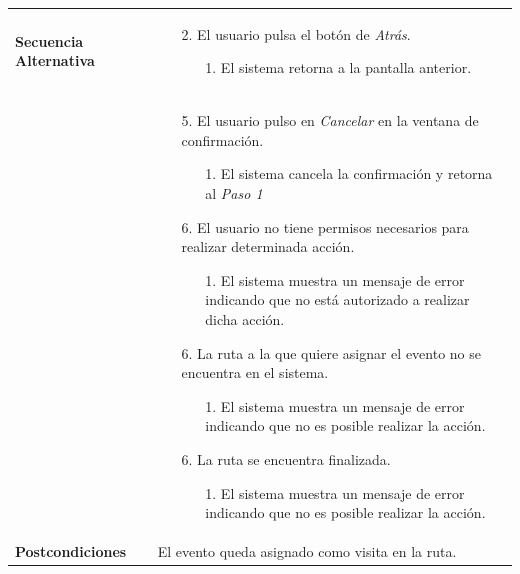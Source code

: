 \begin{longtable}{| p{4cm} | p{10cm} |}
\\
\hline
\textbf{Secuencia Alternativa} &\mbox{}\par\vspace{-\baselineskip}
\begin{enumerate}[leftmargin=0.7cm, topsep=0.1cm]
\item[2.] El usuario pulsa el botón de \textit{Atrás}.
	\begin{itemize}
	\item[1.] El sistema retorna a la pantalla anterior.
	\end{itemize}
\end{enumerate}
\\ &\mbox{}\par\vspace{-\baselineskip}	
\begin{enumerate}[leftmargin=0.7cm, topsep=0.1cm]
\item[5.] El usuario pulso en \textit{Cancelar} en la ventana de confirmación.
	\begin{itemize}
	\item[1.] El sistema cancela la confirmación y retorna al \textit{Paso 1}
	\end{itemize}
\item[6.] El usuario no tiene permisos necesarios para realizar determinada acción.
	\begin{itemize}
	\item[1.] El sistema muestra un mensaje de error indicando que no está autorizado a realizar dicha acción.
	\end{itemize}
\item[6.] La ruta a la que quiere asignar el evento no se encuentra en el sistema.
	\begin{itemize}
	\item[1.] El sistema muestra un mensaje de error indicando que no es posible realizar la acción.
	\end{itemize}
\item[6.] La ruta se encuentra finalizada.
	\begin{itemize}
	\item[1.] El sistema muestra un mensaje de error indicando que no es posible realizar la acción.
	\end{itemize}
\end{enumerate}
\\

\hline
\textbf{Postcondiciones} & 
El evento queda asignado como visita en la ruta.\\
\hline
\end{longtable}



